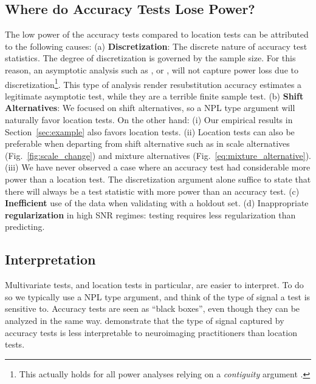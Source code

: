 \documentclass[12pt,a4paper]{article}
\begin{document}
\subsection{Where do Accuracy Tests Lose Power?}
The low power of the accuracy tests compared to location tests can be attributed to the following causes: \newline
(a) \textbf{Discretization}: 
The discrete nature of accuracy test statistics. 
The degree of discretization is governed by the sample size. 
For this reason, an asymptotic analysis such as \cite{ramdas_classification_2016}, or \cite{golland_permutation_2005}, will not capture power loss due to discretization\footnote{This actually holds for all power analyses relying on a \emph{contiguity} argument \cite[Ch.6]{vaart_asymptotic_1998}.}.
This type of analysis render resubstitution accuracy estimates a legitimate asymptotic test, while they are a terrible finite sample test. \newline
(b) \textbf{Shift Alternatives}: 
We focused on shift alternatives, so a NPL type argument will naturally favor location tests. 
On the other hand:
(i) Our empirical results in Section~\ref{sec:example} also favors location tests. 
(ii) Location tests can also be preferable when departing from shift alternative such as in scale alternatives (Fig.~\ref{fig:scale_change}) and mixture alternatives (Fig.~\ref{eq:mixture_alternative}).
(iii) We have never observed a case where an accuracy test had considerable more power than a location test. 
The discretization argument alone suffice to state that there will always be a test statistic with more power than an accuracy test. \newline
(c) \textbf{Inefficient} use of the data when validating with a holdout set. \newline
(d) Inappropriate \textbf{regularization} in high SNR regimes: testing requires less regularization than predicting. \newline



\subsection{Interpretation}
Multivariate tests, and location tests in particular, are easier to interpret. 
To do so we typically use a NPL type argument, and think of the type of signal a test is sensitive to. 
Accuracy tests are seen as ``black boxes'', even though they can be analyzed in the same way. 
\citet{gilron2017s} demonstrate that the type of signal captured by accuracy tests is less interpretable to neuroimaging practitioners than location tests. 
\end{document}
